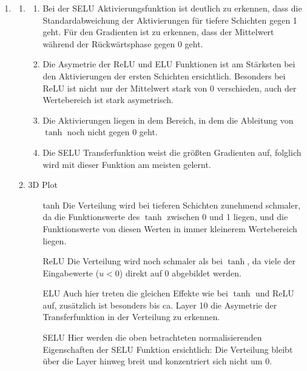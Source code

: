 \documentclass{article}
\begin{document}
\begin{enumerate}
\item
  \begin{enumerate}[label=\alph*)]
  \item
    \begin{enumerate}[label=\roman*.]
      \item Bei der SELU Aktivierungsfunktion ist deutlich zu erkennen, dass die Standardabweichung der Aktivierungen für tiefere Schichten gegen 1 geht. Für den Gradienten ist zu erkennen, dass der Mittelwert während der Rückwärtsphase gegen 0 geht.
      \item Die Asymetrie der ReLU und ELU Funktionen ist am Stärksten bei den Aktivierungen der ersten Schichten ersichtlich. Besonders bei ReLU ist nicht nur der Mittelwert stark von 0 verschieden, auch der Wertebereich ist stark asymetrisch.
      \item Die Aktivierungen liegen in dem Bereich, in dem die Ableitung von $\tanh$ noch nicht gegen 0 geht.
      \item Die SELU Transferfunktion weist die größten Gradienten auf, folglich wird mit dieser Funktion am meisten gelernt.
    \end{enumerate}
  \item 3D Plot
  \begin{itemize}
\item[tanh] Die Verteilung wird bei tieferen Schichten zunehmend schmaler, da die Funktionswerte des $\tanh$ zwischen 0 und 1 liegen, und die Funktionswerte von diesen Werten in immer kleinerem Wertebereich liegen.
\item[ReLU] Die Verteilung wird noch schmaler als bei $\tanh$, da viele der Eingabewerte ($u<0$) direkt auf 0 abgebildet werden.
\item[ELU] Auch hier treten die gleichen Effekte wie bei $\tanh$ und ReLU auf, zusätzlich ist besonders bis ca. Layer 10 die Asymetrie der Transferfunktion in der Verteilung zu erkennen.
\item[SELU] Hier werden die oben betrachteten normalisierenden Eigenschaften der SELU Funktion ersichtlich: Die Verteilung bleibt über die Layer hinweg breit und konzentriert sich nicht um 0.
\end{itemize}
  \end{enumerate}

\end{enumerate}
\end{document}
